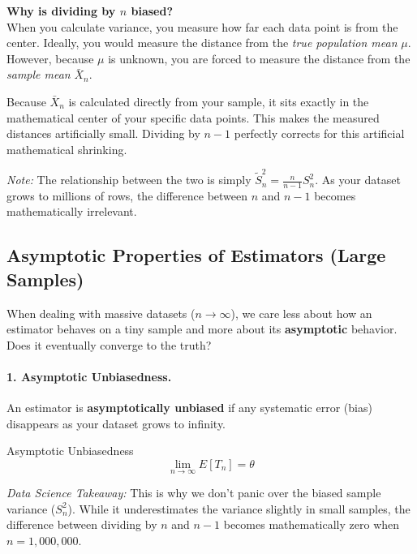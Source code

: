 \vs
\textbf{Why is dividing by $n$ biased?} \\
When you calculate variance, you measure how far each data point is from the center. Ideally, you would measure the distance from the \textit{true population mean} $\mu$. However, because $\mu$ is unknown, you are forced to measure the distance from the \textit{sample mean} $\bar{X}_n$. 

Because $\bar{X}_n$ is calculated directly from your sample, it sits exactly in the mathematical center of your specific data points. This makes the measured distances artificially small. Dividing by $n-1$ perfectly corrects for this artificial mathematical shrinking.

\textit{Note:} The relationship between the two is simply $\tilde{S}_n^2 = \frac{n}{n-1} S_n^2$. As your dataset grows to millions of rows, the difference between $n$ and $n-1$ becomes mathematically irrelevant.

\subsection{Asymptotic Properties of Estimators (Large Samples)}

When dealing with massive datasets ($n \to \infty$), we care less about how an estimator behaves on a tiny sample and more about its \textbf{asymptotic} behavior. Does it eventually converge to the truth?

\vspace{-0.2cm}
\paragraph*{1. Asymptotic Unbiasedness.}
An estimator is \textbf{asymptotically unbiased} if any systematic error (bias) disappears as your dataset grows to infinity.

\begin{defbox}{Asymptotic Unbiasedness}
\begin{equation}
\lim_{n \to \infty} E[T_n] = \theta
\end{equation}
\end{defbox}

\textit{Data Science Takeaway:} This is why we don't panic over the biased sample variance ($S_n^2$). While it underestimates the variance slightly in small samples, the difference between dividing by $n$ and $n-1$ becomes mathematically zero when $n = 1,000,000$. 


\vspace{-0.2cm}
